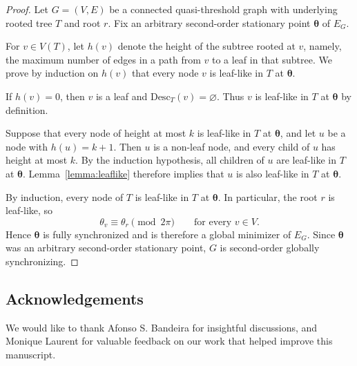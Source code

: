 \documentclass[11pt,reqno]{amsart}
\theoremstyle{definition}
\begin{document}
\begin{proof}
Let $G=(V,E)$ be a connected quasi-threshold graph with
underlying rooted tree $T$ and root $r$.
Fix an arbitrary second-order stationary point
$\boldsymbol{\theta}$ of $E_G$.

For $v\in V(T)$, let $h(v)$ denote the height of the subtree
rooted at $v$, namely, the maximum number of edges in a path
from $v$ to a leaf in that subtree.
We prove by induction on $h(v)$ that every node $v$ is
leaf-like in $T$ at $\boldsymbol{\theta}$.

If $h(v)=0$, then $v$ is a leaf and
$\mathrm{Desc}_T(v)=\varnothing$.
Thus $v$ is leaf-like in $T$ at $\boldsymbol{\theta}$
by definition.

Suppose that every node of height at most $k$ is leaf-like
in $T$ at $\boldsymbol{\theta}$, and let $u$ be a node
with $h(u)=k+1$.
Then $u$ is a non-leaf node, and every child of $u$
has height at most $k$.
By the induction hypothesis, all children of $u$ are
leaf-like in $T$ at $\boldsymbol{\theta}$.
Lemma~\ref{lemma:leaflike} therefore implies that $u$
is also leaf-like in $T$ at $\boldsymbol{\theta}$.

By induction, every node of $T$ is leaf-like in $T$
at $\boldsymbol{\theta}$.
In particular, the root $r$ is leaf-like, so
\[
    \theta_v\equiv\theta_r\pmod{2\pi}
    \qquad \text{for every } v\in V.
\]
Hence $\boldsymbol{\theta}$ is fully synchronized and
is therefore a global minimizer of $E_G$.
Since $\boldsymbol{\theta}$ was an arbitrary second-order
stationary point, $G$ is second-order globally synchronizing.
\end{proof}
\subsection*{Acknowledgements}
We would like to thank Afonso S. Bandeira for insightful discussions, and Monique Laurent for valuable feedback on our work that helped improve this manuscript.


%
\setcounter{tocdepth}{1}%
\vspace*{1cm}

\end{document}
